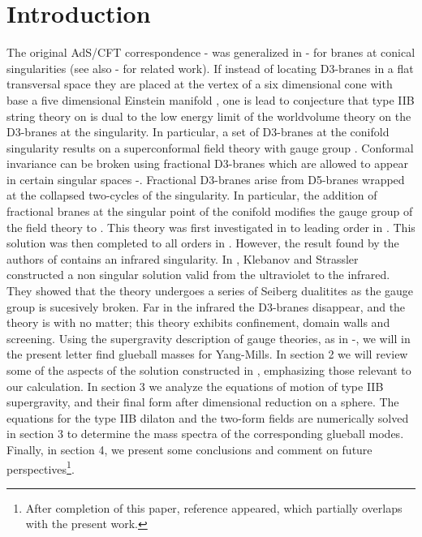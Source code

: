 \documentclass[12pt,epsf,a4paper]{article}
\begin{document}
\newpage




\section{Introduction}

The original AdS/CFT correspondence \cite{ads/cft}-\cite{Witten1} was generalized in 
\cite{Kachru}-\cite{Morrison} for branes at conical singularities (see also 
\cite{Gubser}-\cite{Klebanov:2000me} for related work). If instead 
of locating D3-branes in a flat transversal space they are placed at the vertex of a six 
dimensional cone with base a five dimensional Einstein manifold \coordHE{}, one is lead 
to conjecture that type IIB string theory on \coordHE{} is dual to the low 
energy limit of the worldvolume theory on the D3-branes at the singularity. In 
particular, a set of \coordHE{} D3-branes at the conifold singularity results on a 
\coordHE{} superconformal field theory with  \coordHE{} gauge group \cite{KW1}. 
Conformal invariance can be broken 
using  fractional D3-branes which are allowed to appear in certain  
singular spaces \cite{Gimon}-\cite{KN}. Fractional D3-branes arise from D5-branes wrapped at 
the collapsed two-cycles of the singularity. In particular, the addition of \coordHE{} fractional 
branes at the singular point of the conifold modifies the gauge group of the field theory to 
\coordHE{}. 
This theory was first investigated in \cite{KN} to leading order in \coordHE{}. This solution was 
then completed to all orders in \cite{KT}. However, the result found by the authors 
of \cite{KT} contains an infrared singularity. In \cite{KS}, Klebanov and Strassler constructed 
a non singular solution valid from the ultraviolet to the infrared. They showed 
that the theory undergoes a series of Seiberg dualitites as 
the gauge group is sucesively broken. Far in the infrared 
the D3-branes disappear,
and the theory is \coordHE{}  \coordHE{} with no matter; this theory 
exhibits confinement, domain walls and screening. Using the supergravity description 
of gauge theories, as in \cite{Witten-g}-\cite{gb2}, we will 
in the present letter find glueball masses
 for \coordHE{}  \coordHE{} Yang-Mills. In section 2 we will 
review some of the aspects of the solution constructed in 
\cite{KS}, emphasizing those relevant to our calculation. In section 3 we analyze the 
equations of motion of type IIB supergravity, and their final form after dimensional 
reduction on a sphere. The equations for the type IIB dilaton and the two-form fields 
are numerically solved in section 3 to determine the mass spectra of the corresponding  
glueball modes. Finally, in section 4, we present some conclusions and comment on 
future perspectives\footnote{After completion of this paper, reference \cite{krasnitz} 
appeared, which partially overlaps with the present work.}.
  
\end{document}
